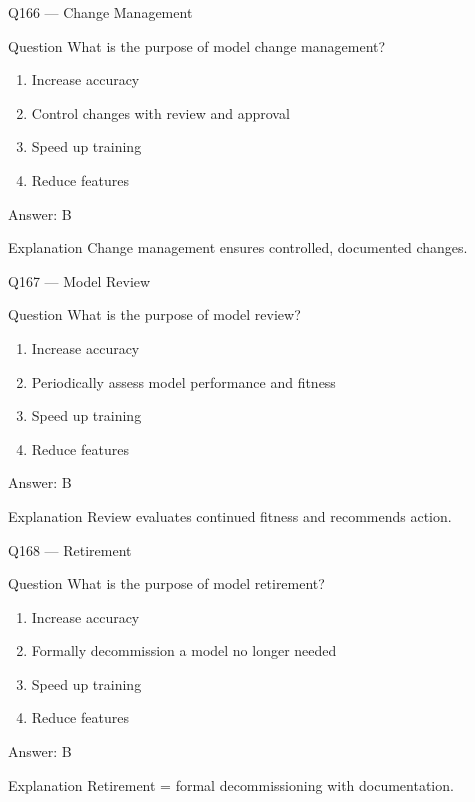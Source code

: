 \documentclass[aspectratio=169,8pt]{beamer}
\begin{document}
	\begin{frame}{Q166 --- Change Management}
		\begin{block}{Question}
			What is the purpose of model change management?
		\end{block}
		\begin{enumerate}
			\item Increase accuracy
			\item Control changes with review and approval
			\item Speed up training
			\item Reduce features
		\end{enumerate}
		\begin{exampleblock}{Answer: B}\end{exampleblock}
		\begin{block}{Explanation}
			Change management ensures controlled, documented changes.
		\end{block}
	\end{frame}
	
	\begin{frame}{Q167 --- Model Review}
		\begin{block}{Question}
			What is the purpose of model review?
		\end{block}
		\begin{enumerate}
			\item Increase accuracy
			\item Periodically assess model performance and fitness
			\item Speed up training
			\item Reduce features
		\end{enumerate}
		\begin{exampleblock}{Answer: B}\end{exampleblock}
		\begin{block}{Explanation}
			Review evaluates continued fitness and recommends action.
		\end{block}
	\end{frame}
	
	\begin{frame}{Q168 --- Retirement}
		\begin{block}{Question}
			What is the purpose of model retirement?
		\end{block}
		\begin{enumerate}
			\item Increase accuracy
			\item Formally decommission a model no longer needed
			\item Speed up training
			\item Reduce features
		\end{enumerate}
		\begin{exampleblock}{Answer: B}\end{exampleblock}
		\begin{block}{Explanation}
			Retirement = formal decommissioning with documentation.
		\end{block}
	\end{frame}
	
\end{document}
